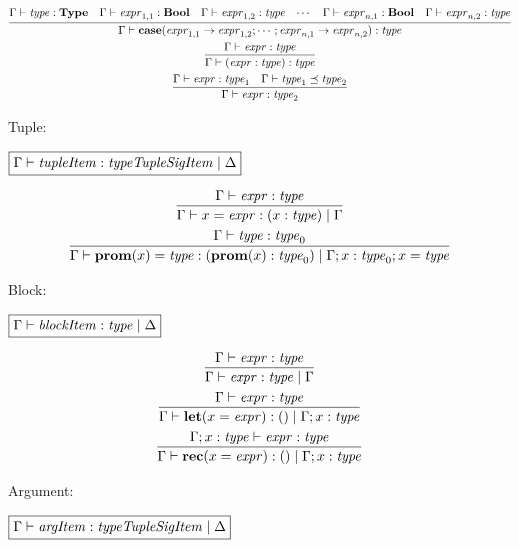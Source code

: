 \begin{gather*}
  \infer{\Gamma \vdash \mathbf{case}(\mathit{expr}_{1,1} \rightarrow \mathit{expr}_{1,2}; \cdots; \mathit{expr}_{n,1} \rightarrow \mathit{expr}_{n,2}): \mathit{type}}{
    \Gamma \vdash \mathit{type}: \mathbf{Type}
    &
    \Gamma \vdash \mathit{expr}_{1, 1}: \mathbf{Bool}
    &
    \Gamma \vdash \mathit{expr}_{1, 2}: \mathit{type}
    &
    \cdots
    &
    \Gamma \vdash \mathit{expr}_{n, 1}: \mathbf{Bool}
    &
    \Gamma \vdash \mathit{expr}_{n, 2}: \mathit{type}
  }
  \\
  \infer{\Gamma \vdash (\mathit{expr}: \mathit{type}): \mathit{type}}{
    \Gamma \vdash \mathit{expr}: \mathit{type}
  }
  \\
  \infer{\Gamma \vdash \mathit{expr}: \mathit{type}_2}{
    \Gamma \vdash \mathit{expr}: \mathit{type}_1
    &
    \Gamma \vdash \mathit{type}_1 \preceq \mathit{type}_2
  }
\end{gather*}

Tuple:

$\fbox{$\Gamma \vdash \mathit{tupleItem}: \mathit{typeTupleSigItem} \mid \Delta$}$

\begin{gather*}
  \infer{\Gamma \vdash x = \mathit{expr}: (x: \mathit{type}) \mid \Gamma}{
    \Gamma \vdash \mathit{expr}: \mathit{type}
  }
  \\
  \infer{\Gamma \vdash \mathbf{prom}(x) = \mathit{type}: (\mathbf{prom}(x): \mathit{type}_0) \mid \Gamma; x: \mathit{type}_0; x = \mathit{type}}{
    \Gamma \vdash \mathit{type}: \mathit{type}_0
  }
\end{gather*}

Block:

$\fbox{$\Gamma \vdash \mathit{blockItem}: \mathit{type} \mid \Delta$}$

\begin{gather*}
  \infer{\Gamma \vdash \mathit{expr}: \mathit{type} \mid \Gamma}{
    \Gamma \vdash \mathit{expr}: \mathit{type}
  }
  \\
  \infer{\Gamma \vdash \mathbf{let}(x = \mathit{expr}): () \mid \Gamma; x: \mathit{type}}{
    \Gamma \vdash \mathit{expr}: \mathit{type}
  }
  \\
  \infer{\Gamma \vdash \mathbf{rec}(x = \mathit{expr}): () \mid \Gamma; x: \mathit{type}}{
    \Gamma; x: \mathit{type} \vdash \mathit{expr}: \mathit{type}
  }
\end{gather*}

Argument:

$\fbox{$\Gamma \vdash \mathit{argItem}: \mathit{typeTupleSigItem} \mid \Delta$}$

